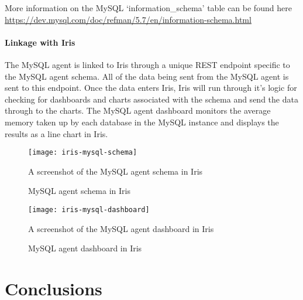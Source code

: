 \documentclass[12pt,a4paper,titlepage]{report}
\begin{document}
More information on the MySQL `information\_schema' table can be found here \url{https://dev.mysql.com/doc/refman/5.7/en/information-schema.html}


\subsubsection{Linkage with Iris}
The MySQL agent is linked to Iris through a unique REST endpoint specific to the MySQL agent schema. All of the data being sent from the MySQL agent is sent to this endpoint. Once the data enters Iris, Iris will run through it's logic for checking for dashboards and charts associated with the schema and send the data through to the charts. 
The MySQL agent dashboard monitors the average memory taken up by each database in the MySQL instance and displays the results as a line chart in Iris.
\begin{figure}[H]
\begin{tcolorbox}
\begin{center}
\texttt{[image: iris-mysql-schema]}
\end{center}
A screenshot of the MySQL agent schema in Iris
\end{tcolorbox}
\caption{MySQL agent schema in Iris}
\end{figure}

\begin{figure}[H]
\begin{tcolorbox}
\begin{center}
\texttt{[image: iris-mysql-dashboard]}
\end{center}
A screenshot of the MySQL agent dashboard in Iris
\end{tcolorbox}
\caption{MySQL agent dashboard in Iris}
\end{figure}

\chapter{Conclusions}


\nocite{*}
\printbibliography

\clearpage

\begin{appendices}

\end{appendices}
\end{document}
